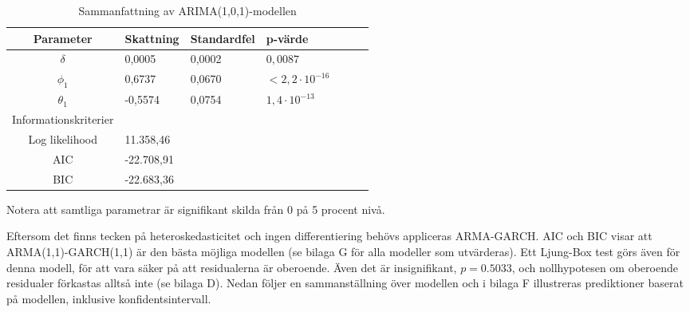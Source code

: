 \documentclass[11pt]{article}
\numberwithin{equation}{section}
\numberwithin{table}{section}
\numberwithin{figure}{section}
\begin{document}
\begin{table}[H]
\caption{Sammanfattning av ARIMA(1,0,1)-modellen}
\begin{tabularx}{\textwidth}{c *{6}{Y}}
\toprule

Parameter  & Skattning & Standardfel & p-värde \\
\hline

$\delta$        & 0,0005  & 0,0002  & $0,0087$   \\
$\phi_1$        & 0,6737  & 0,0670  & $<2,2\cdot10^{-16}$   \\

$\theta_1$      & -0,5574 & 0,0754  &  $1,4\cdot10^{-13}$   \\
\midrule

Informationskriterier  & &  &  \\
\hline

Log likelihood        & 11.358,46 \\
AIC                   & -22.708,91 \\

BIC                   & -22.683,36 \\
\bottomrule
\end{tabularx}
\footnotesize{Notera att samtliga parametrar är signifikant skilda från 0 på 5 procent nivå.}
\end{table}

Eftersom det finns tecken på heteroskedasticitet och ingen differentiering behövs appliceras ARMA-GARCH. AIC och BIC visar att ARMA(1,1)-GARCH(1,1) är den bästa möjliga modellen (se bilaga G för alla modeller som utvärderas). Ett Ljung-Box test görs även för denna modell, för att vara säker på att residualerna är oberoende. Även det är insignifikant, $p=0.5033$, och nollhypotesen om oberoende residualer förkastas alltså inte (se bilaga D). Nedan följer en sammanställning över modellen och i bilaga F illustreras prediktioner baserat på modellen, inklusive konfidentsintervall.
\end{document}
